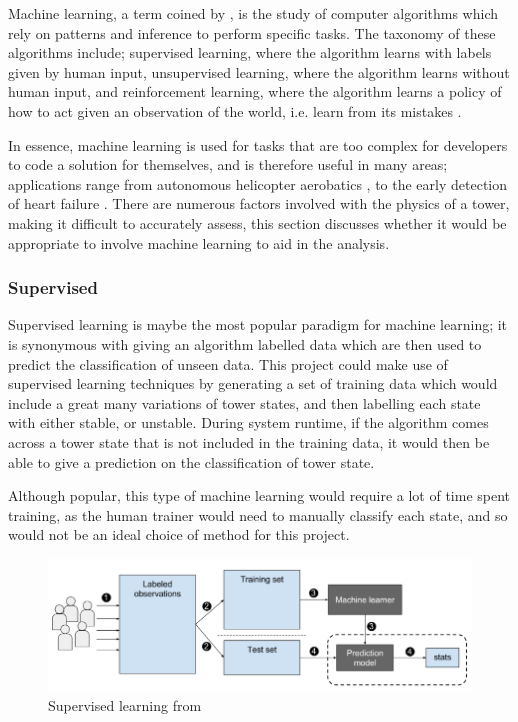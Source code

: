 Machine learning, a term coined by \citet{machinelearning}, is the study of computer algorithms which rely on patterns and inference to perform specific tasks. The taxonomy of these algorithms include; supervised learning, where the algorithm learns with labels given by human input, unsupervised learning, where the algorithm learns without human input, and reinforcement learning, where the algorithm learns a policy of how to act given an observation of the world, i.e. learn from its mistakes \citep{machinelearningtypes}.

In essence, machine learning is used for tasks that are too complex for developers to code a solution for themselves, and is therefore useful in many areas; applications range from autonomous helicopter aerobatics \citet{autonomoushelicopter}, to the early detection of heart failure \citep{machinelearningheart}. There are numerous factors involved with the physics of a \jenga{} tower, making it difficult to accurately assess, this section discusses whether it would be appropriate to involve machine learning to aid in the analysis.

\subsubsection{Supervised}

Supervised learning is maybe the most popular paradigm for machine learning; it is synonymous with giving an algorithm labelled data which are then used to predict the classification of unseen data. This project could make use of supervised learning techniques by generating a set of training data which would include a great many variations of tower states, and then labelling each state with either stable, or unstable. During system runtime, if the algorithm comes across a tower state that is not included in the training data, it would then be able to give a prediction on the classification of tower state.

Although popular, this type of machine learning would require a lot of time spent training, as the human trainer would need to manually classify each state, and so would not be an ideal choice of method for this project.

\begin{figure}[ht]
\begin{minipage}{\textwidth}
    \centering
    \includegraphics[width=.8\linewidth]{images/litreview/Supervised_machine_learning_in_a_nutshell}
    \caption{Supervised learning from  \protect{}}
    \label{fig:supervisedlearning}
\end{minipage}
\end{figure}

